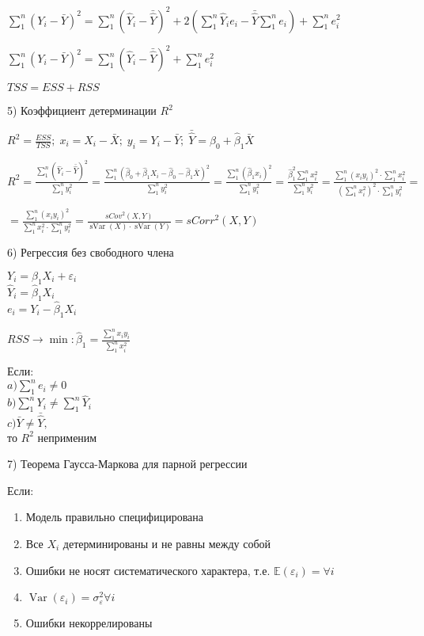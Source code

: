 \documentclass[12pt]{article}
\newcommand{\e}{\mathbb{E}}
\DeclareMathOperator{\var}{Var}
\DeclareMathOperator{\svar}{sVar}
\renewcommand{\epsilon}{\varepsilon}
\newcommand{\msum}{\sum\limits_1^n}
\begin{document}
$\msum (Y_i - \bar{Y})^2 = \msum (\hat{Y}_i - \bar{\hat{Y}})^2 + 2 (\msum \hat{Y}_i e_i - \bar{\hat{Y}} \msum e_i) + \msum e_i^2$

$\msum (Y_i - \bar{Y})^2 = \msum (\hat{Y}_i - \bar{\hat{Y}})^2 + \msum e_i^2$

$TSS = ESS + RSS$

5) Коэффициент детерминации $R^2$

$R^2 = \frac{ESS}{TSS}; \; x_i = X_i - \bar{X}; \; y_i = Y_i - \bar{Y}; \; \bar{\hat{Y}} = \hat{\beta}_0 + \hat{\beta}_1 \bar{X}$

$R^2 = \frac{\msum (\hat{Y}_i - \bar{\hat{Y}})^2}{\msum y_i^2} = \frac{\msum (\hat{\beta}_0 + \hat{\beta}_1 X_i - \hat{\beta}_0 - \hat{\beta}_1 \bar{X})^2}{\msum y_i^2} = \frac{\msum (\hat{\beta}_1 x_i)^2}{\msum y_i^2} = \frac{\hat{\beta}_1^2 \msum x_i^2}{\msum y_i^2} = \frac{\msum (x_i y_i)^2 \cdot \msum x_i^2}{(\msum x_i^2)^2 \cdot \msum y_i^2} =$

$= \frac{\msum (x_i y_i)^2}{\msum x_i^2 \cdot \msum y_i^2} = \frac{sCov^2(X,Y)}{\svar(X) \cdot \svar(Y)} = sCorr^2(X,Y)$

6) Регрессия без свободного члена

\begin{minipage}{0.18\textwidth}
$Y_i = \beta_1 X_i + \epsilon_i$\\[2mm]	
$\hat{Y}_i = \hat{\beta}_1 X_i$\\[2mm]		
$e_i = Y_i - \hat{\beta}_1 X_i$
\end{minipage}
\begin{minipage}{0.35\textwidth}
$RSS \rightarrow \min: \hat{\beta}_1 = \frac{\msum x_i y_i}{\msum x_i^2}$
\end{minipage}
\begin{minipage}{0.3\textwidth}
Если:\\[2mm]
$a) \msum e_i \ne 0$\\[2mm]		
$b) \msum Y_i \ne \msum \hat{Y}_i$\\[2mm]		
$c) \bar{Y} \ne \bar{\hat{Y}},$\\[2mm]
то $R^2$ неприменим
\end{minipage}

7) Теорема Гаусса-Маркова для парной регрессии

Если:\\[-9mm]
\begin{enumerate}
	\item Модель правильно специфицирована
	\item Все $X_i$ детерминированы и не равны между собой
	\item Ошибки не носят систематического характера, т.е. $\e(\epsilon_i) =  \forall i$
	\item $\var(\epsilon_i) = \sigma_{\epsilon}^2 \forall i$
	\item Ошибки некоррелированы
\end{enumerate}
\end{document}

